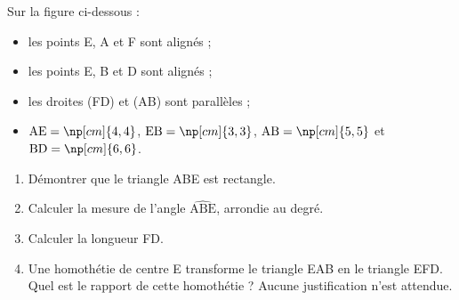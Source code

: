 \documentclass[exercice,a4]{thedocument}%
\begin{document}
%
Sur la figure ci-dessous :
\begin{itemize}
    \item les points E, A et F sont alignés ;
    \item les points E, B et D sont alignés ;
    \item les droites (FD) et (AB) sont parallèles ;
    \item $\mathrm{AE}=\np[cm]{4,4}$, $\mathrm{EB}=\np[cm]{3,3}$,
    $\mathrm{AB}=\np[cm]{5,5}$ et $\mathrm{BD}=\np[cm]{6,6}$.
\end{itemize}

\begin{center}
\end{center}

\begin{enumerate}
    \item Démontrer que le triangle ABE est rectangle.
    \item Calculer la mesure de l'angle $\widehat{\mathrm{ABE}}$, arrondie
    au degré.
    \item Calculer la longueur FD.
    \item Une homothétie de centre E transforme le triangle EAB en le
    triangle EFD. Quel est le rapport de cette homothétie ? Aucune
    justification n'est attendue.
\end{enumerate}
\showthesource
\end{document}
